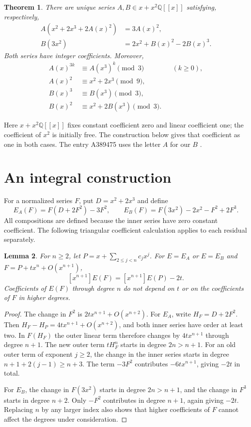 \documentclass[11pt]{article}
\newtheorem{theorem}{Theorem}
\newtheorem{lemma}[theorem]{Lemma}
\newcommand{\Q}{\mathbb Q}
\newcommand{\coef}[1]{[x^{#1}]}
\begin{document}
\begin{theorem}\label{thm:main}
There are unique series $A,B\in x+x^2\Q[[x]]$ satisfying, respectively,
\begin{align}
 A(x^2+2x^3+2A(x)^2)&=3A(x)^2,\label{eq:A}\\
 B(3x^2)&=2x^2+B(x)^2-2B(x)^3.\label{eq:B}
\end{align}
Both series have integer coefficients. Moreover,
\begin{align}
 A(x)^{3k}&\equiv A(x^3)^k\pmod3 &&(k\geq0),\label{eq:FrobA}\\
 A(x)^2&\equiv x^2+2x^3\pmod9,\label{eq:nine}\\
 B(x)^3&\equiv B(x^3)\pmod3,\label{eq:FrobB}\\
 B(x)^2&\equiv x^2+2B(x^3)\pmod3.\label{eq:Bsquare}
\end{align}
\end{theorem}
Here $x+x^2\Q[[x]]$ fixes constant coefficient zero and linear coefficient
one; the coefficient of $x^2$ is initially free. The construction below
gives that coefficient as one in both cases. The entry A389475 uses the
letter $A$ for our $B$ \cite{hanna475}.

\section{An integral construction}
For a normalized series $F$, put $D=x^2+2x^3$ and define
\[
 E_A(F)=F(D+2F^2)-3F^2,\qquad
 E_B(F)=F(3x^2)-2x^2-F^2+2F^3.
\]
All compositions are defined because the inner series have zero constant
coefficient. The following triangular coefficient calculation applies to
each residual separately.

\begin{lemma}\label{lem:triangular}
For $n\geq2$, let $P=x+\sum_{2\leq j<n}c_jx^j$.
For $E=E_A$ or $E=E_B$ and $F=P+t x^n+O(x^{n+1})$,
\[
 \coef{n+1}E(F)=\coef{n+1}E(P)-2t.
\]
Coefficients of $E(F)$ through degree $n$ do not depend on $t$ or on the
coefficients of $F$ in higher degrees.
\end{lemma}
\begin{proof}
The change in $F^2$ is $2t x^{n+1}+O(x^{n+2})$.
For $E_A$, write $H_F=D+2F^2$. Then
$H_F-H_P=4t x^{n+1}+O(x^{n+2})$, and both inner series have order at least
two. In $F(H_F)$ the outer linear term therefore changes by
$4t x^{n+1}$ through degree $n+1$.
The new outer term $tH_F^n$ starts in degree $2n>n+1$.
For an old outer term of exponent $j\geq2$, the change in the inner series
starts in degree $n+1+2(j-1)\geq n+3$.
The term $-3F^2$ contributes $-6t x^{n+1}$, giving $-2t$ in total.

For $E_B$, the change in $F(3x^2)$ starts in degree $2n>n+1$,
and the change in $F^3$ starts in degree $n+2$.
Only $-F^2$ contributes in degree $n+1$, again giving $-2t$.
Replacing $n$ by any larger index also shows that higher coefficients of
$F$ cannot affect the degrees under consideration.
\end{proof}
\end{document}
